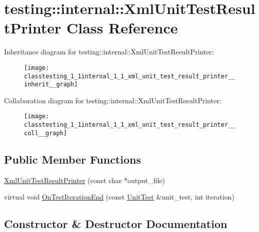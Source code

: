 \hypertarget{classtesting_1_1internal_1_1_xml_unit_test_result_printer}{}\section{testing\+:\+:internal\+:\+:Xml\+Unit\+Test\+Result\+Printer Class Reference}
\label{classtesting_1_1internal_1_1_xml_unit_test_result_printer}


Inheritance diagram for testing\+:\+:internal\+:\+:Xml\+Unit\+Test\+Result\+Printer\+:
\nopagebreak
\begin{figure}[H]
\begin{center}
\leavevmode
\texttt{[image: classtesting\_1\_1internal\_1\_1\_xml\_unit\_test\_result\_printer\_\_inherit\_\_graph]}
\end{center}
\end{figure}


Collaboration diagram for testing\+:\+:internal\+:\+:Xml\+Unit\+Test\+Result\+Printer\+:
\nopagebreak
\begin{figure}[H]
\begin{center}
\leavevmode
\texttt{[image: classtesting\_1\_1internal\_1\_1\_xml\_unit\_test\_result\_printer\_\_coll\_\_graph]}
\end{center}
\end{figure}
\subsection*{Public Member Functions}
\begin{DoxyCompactItemize}
\item 
\hyperlink{classtesting_1_1internal_1_1_xml_unit_test_result_printer_afdaf88e6764c18ce0dcc3733d7a06e31}{Xml\+Unit\+Test\+Result\+Printer} (const char $\ast$output\+\_\+file)
\item 
virtual void \hyperlink{classtesting_1_1internal_1_1_xml_unit_test_result_printer_a2ae986dd2f4f2aed31cc6f3bc8c56898}{On\+Test\+Iteration\+End} (const \hyperlink{classtesting_1_1_unit_test}{Unit\+Test} \&unit\+\_\+test, int iteration)
\end{DoxyCompactItemize}


\subsection{Constructor \& Destructor Documentation}
